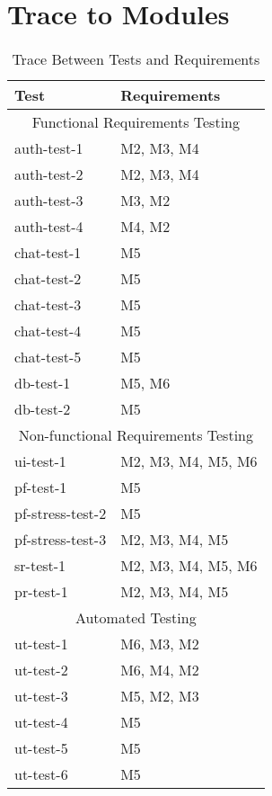\documentclass[12pt, titlepage]{article}
\begin{document}
\section{Trace to Modules}		%
\begin{center}

\begin{table}[!htbp]
			\begin{tabular}{ll}
				\toprule
				Test & Requirements \\
				\midrule
				\multicolumn{2}{c}{Functional Requirements Testing} \\
				\midrule
				auth-test-1 & M2, M3, M4\\
                auth-test-2 & M2, M3, M4 \\
                auth-test-3 & M3, M2\\
                auth-test-4 & M4, M2\\
                chat-test-1 & M5\\
                chat-test-2 & M5\\
                chat-test-3 & M5\\
                chat-test-4 & M5\\
                chat-test-5 & M5\\
                db-test-1 & M5, M6\\
                db-test-2 & M5\\
				\midrule
				\multicolumn{2}{c}{Non-functional Requirements Testing} \\
				\midrule
                ui-test-1 & M2, M3, M4, M5, M6\\
                pf-test-1 & M5\\
                pf-stress-test-2 & M5\\
                pf-stress-test-3 & M2, M3, M4, M5\\
                sr-test-1 & M2, M3, M4, M5, M6\\
                pr-test-1 & M2, M3, M4, M5\\
				\midrule
				\multicolumn{2}{c}{Automated Testing} \\
				\midrule
				ut-test-1 & M6, M3, M2\\ %
				ut-test-2 & M6, M4, M2\\ %
				ut-test-3 & M5, M2, M3\\ %
				ut-test-4 & M5\\ %
				ut-test-5 & M5\\ %
				ut-test-6 & M5\\ %
				\bottomrule
			\end{tabular}
			\caption{Trace Between Tests and Requirements}
			\makeatletter
			\def\rulecolor#1#{\CT@arc{#1}}
			\def\CT@arc#1#2{%
				\ifdim\baselineskip=\z@\noalign\fi
				{\gdef\CT@arc@{\color#1{#2}}}}
			\let\CT@arc@\relax
			\makeatother
			\label{Table}
		\end{table}
    
\end{center}
		
\end{document}
